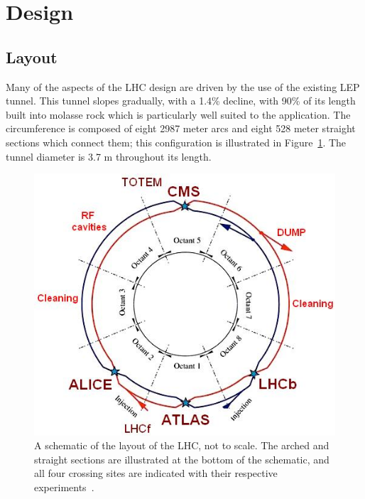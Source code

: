 
\section{Design}

\subsection{Layout}

Many of the aspects of the \ac{LHC} design are driven by the use of the existing \ac{LEP} tunnel. 
This tunnel slopes gradually, with a 1.4\% decline, with 90\% of its length built into molasse rock which is particularly well suited to the application.
The circumference is composed of eight 2987 meter arcs and eight 528 meter straight sections which connect them; this configuration is illustrated in Figure~\ref{fig:lhc_schematic}.
The tunnel diameter is 3.7 m throughout its length. 

\begin{figure}
\includegraphics[width=\fullfig]{figures/lhc_schematic.jpg}
\caption{A schematic of the layout of the \acs*{LHC}, not to scale. The arched and straight sections are illustrated at the bottom of the schematic, and all four crossing sites are indicated with their respective experiments~\cite{lhc_machine}.}
\label{fig:lhc_schematic}
\end{figure}

